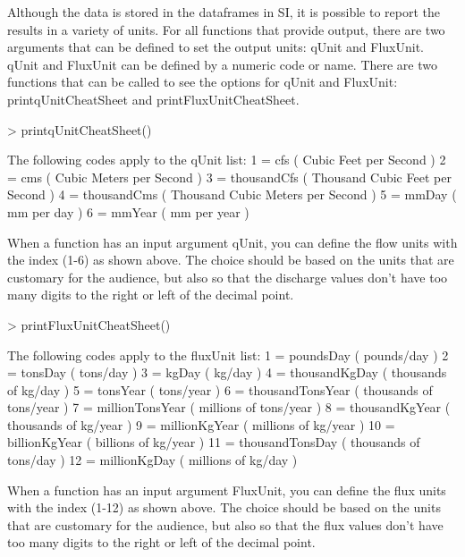 \documentclass[a4paper,11pt]{article}
\begin{document}
Although the data is stored in the dataframes in SI, it is possible to report the results in a variety of units. For all functions that provide output, there are two arguments that can be defined to set the output units: qUnit and FluxUnit.  qUnit and FluxUnit can be defined by a numeric code or name.  There are two functions that can be called to see the options for qUnit and FluxUnit: printqUnitCheatSheet and printFluxUnitCheatSheet.


\begin{Schunk}
\begin{Sinput}
> printqUnitCheatSheet()
\end{Sinput}
\begin{Soutput}
The following codes apply to the qUnit list:
1 =  cfs  ( Cubic Feet per Second )
2 =  cms  ( Cubic Meters per Second )
3 =  thousandCfs  ( Thousand Cubic Feet per Second )
4 =  thousandCms  ( Thousand Cubic Meters per Second )
5 =  mmDay  ( mm per day )
6 =  mmYear  ( mm per year )
\end{Soutput}
\end{Schunk}

When a function has an input argument qUnit, you can define the flow units with the index (1-6) as shown above. The choice should be based on the units that are customary for the audience, but also so that the discharge values don't have too many digits to the right or left of the decimal point.

\begin{Schunk}
\begin{Sinput}
> printFluxUnitCheatSheet()
\end{Sinput}
\begin{Soutput}
The following codes apply to the fluxUnit list:
1 =  poundsDay  ( pounds/day )
2 =  tonsDay  ( tons/day )
3 =  kgDay  ( kg/day )
4 =  thousandKgDay  ( thousands of kg/day )
5 =  tonsYear  ( tons/year )
6 =  thousandTonsYear  ( thousands of tons/year )
7 =  millionTonsYear  ( millions of tons/year )
8 =  thousandKgYear  ( thousands of kg/year )
9 =  millionKgYear  ( millions of kg/year )
10 =  billionKgYear  ( billions of kg/year )
11 =  thousandTonsDay  ( thousands of tons/day )
12 =  millionKgDay  ( millions of kg/day )
\end{Soutput}
\end{Schunk}

When a function has an input argument FluxUnit, you can define the flux units with the index (1-12) as shown above. The choice should be based on the units that are customary for the audience, but also so that the flux values don't have too many digits to the right or left of the decimal point.
\end{document}
